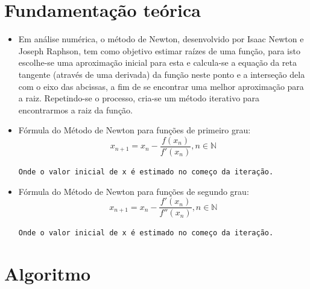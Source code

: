 \documentclass[12pt]{article}
\begin{document}
\section{Fundamentação teórica}
\begin{itemize}
	 \item Em análise numérica, o método de Newton, desenvolvido por Isaac Newton e Joseph Raphson, tem como objetivo estimar raízes de uma função, para isto escolhe-se uma aproximação inicial para esta e calcula-se a equação da reta tangente (através de uma derivada) da função neste ponto e a interseção dela com o eixo das abcissas, a fim de se encontrar uma melhor aproximação para a raiz. Repetindo-se o processo, cria-se um método iterativo para encontrarmos a raiz da função.
    \item Fórmula do Método de Newton para funções de primeiro grau:
    \begin{equation}
        x_{n+1} = x_n - \frac{f(x_n)}{f'(x_n)}, n \in \mathbb{N}
    \end{equation}
    \begin{center}
        \small{\texttt{Onde o valor inicial de x é estimado no começo da iteração.}}
    \end{center}
    \item Fórmula do Método de Newton para funções de segundo grau:
    \begin{equation}
        x_{n+1} = x_n - \frac{f'(x_n)}{f''(x_n)}, n \in \mathbb{N}
    \end{equation}
    \begin{center}
        \small{\texttt{Onde o valor inicial de x é estimado no começo da iteração.}}
    \end{center}
\end{itemize}

\section{Algoritmo}
\end{document}
